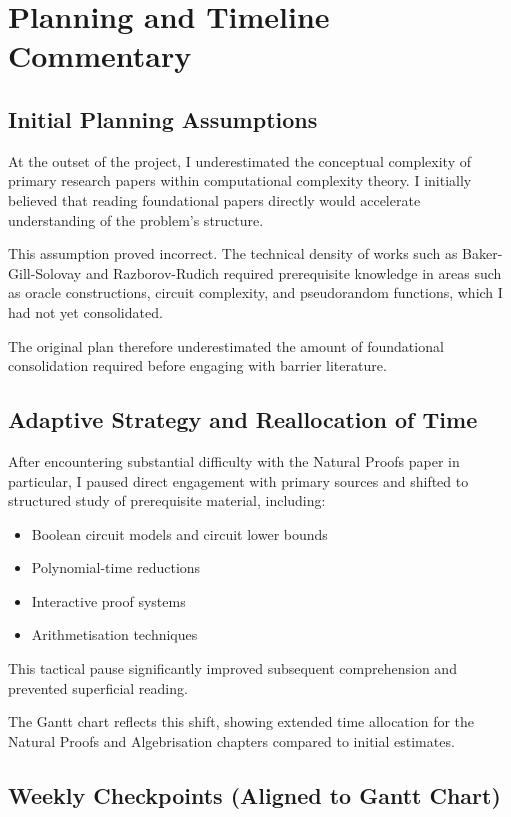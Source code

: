\documentclass[12pt]{article}
\begin{document}
\section{Planning and Timeline Commentary}

\subsection{Initial Planning Assumptions}

At the outset of the project, I underestimated the conceptual complexity of primary research papers within computational complexity theory. I initially believed that reading foundational papers directly would accelerate understanding of the problem's structure.

This assumption proved incorrect. 
The technical density of works such as Baker-Gill-Solovay and Razborov-Rudich required prerequisite knowledge in areas such as oracle constructions, circuit complexity, and pseudorandom functions, which I had not yet consolidated.

The original plan therefore underestimated the amount of foundational consolidation required before engaging with barrier literature.

\subsection{Adaptive Strategy and Reallocation of Time}

After encountering substantial difficulty with the Natural Proofs paper in particular, I paused direct engagement with primary sources and shifted to structured study of prerequisite material, including:

\begin{itemize}
    \item Boolean circuit models and circuit lower bounds
    \item Polynomial-time reductions
    \item Interactive proof systems
    \item Arithmetisation techniques
\end{itemize}

This tactical pause significantly improved subsequent comprehension and prevented superficial reading.

The Gantt chart reflects this shift, showing extended time allocation for the Natural Proofs and Algebrisation chapters compared to initial estimates.

\subsection{Weekly Checkpoints (Aligned to Gantt Chart)}
\end{document}
